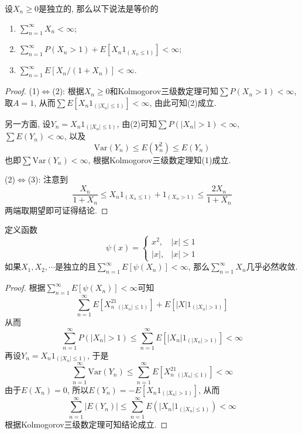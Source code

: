 \documentclass[cn, 12pt, math=mtpro2, bibstyle=apa, blue, twocol]{elegantbook}
\begin{document}
\begin{example}
设$X_n\ge0$是独立的, 那么以下说法是等价的
\begin{enumerate}[label=(\arabic*)]
  \item $\sum_{n=1}^{\infty}X_n<\infty$;
  \item $\sum_{n=1}^{\infty}P(X_n>1)+E[X_n1_{(X_n\leq 1)}]<\infty$;
  \item $\sum_{n=1}^{\infty}E[X_n/(1+X_n)]<\infty$.
\end{enumerate}
\end{example}
\begin{proof}
  (1)$\Longleftrightarrow$(2): 根据$X_n\ge0$和Kolmogorov三级数定理可知$\sum P(X_n>1)<\infty$, 取$A=1$, 从而$\sum E[X_n1_{(|X_n|\leq1)}]<\infty$, 由此可知(2)成立.

  另一方面, 设$Y_n=X_n1_{(|X_n|\leq 1)}$, 由(2)可知$\sum P(|X_n|>1)<\infty$, $\sum E(Y_n)<\infty$, 以及
  $$\text{Var}(Y_n)\leq E(Y^2_n)\leq E(Y_n)$$
  也即$\sum\text{Var}(Y_n)<\infty$, 根据Kolmogorov三级数定理知(1)成立.

  (2)$\Longleftrightarrow$(3): 注意到
  $$\frac{X_n}{1+X_n}\leq X_n1_{(X_n\leq1)}+1_{(X_n>1)} \leq \frac{2X_n}{1+X_n}$$
  两端取期望即可证得结论.
\end{proof}

\begin{example}
定义函数
$$\psi(x)=\begin{cases}
            x^2, & |x|\leq 1 \\
            |x|, & |x|>1
          \end{cases}
$$
如果$X_1,X_2,\cdots$是独立的且$\sum_{n=1}^{\infty}E[\psi(X_n)]<\infty$, 那么$\sum_{n=1}^{\infty}X_n$几乎必然收敛.
\end{example}
\begin{proof}
  根据$\sum_{n=1}^{\infty}E[\psi(X_n)]<\infty$可知
  $$\sum_{n=1}^{\infty} E[X_n^21_{(|X_n|\leq 1)}]+E[|X|1_{(|X_n|>1)}]$$
  从而
  $$\sum_{n=1}^{\infty}P(|X_n|>1)\leq \sum_{n=1}^{\infty}E[|X_n|1_{(|X_n|>1)}]<\infty$$
  再设$Y_n=X_n1_{(|X_n|\leq 1)}$, 于是
  $$\sum_{n=1}^{\infty}\text{Var}(Y_n)\leq \sum_{n=1}^{\infty}E[X_n^21_{(|X_n|\leq 1)}]<\infty$$
  由于$E(X_n)=0$, 所以$E(Y_n)=-E[X_n1_{(|X_n|>1)}]$, 从而
  $$\sum_{n=1}^{\infty}|E(Y_n)|\leq \sum_{n=1}^{\infty}E(|X_n|1_{(|X_n|\leq 1)})<\infty$$
  根据Kolmogorov三级数定理可知结论成立.
\end{proof}
\end{document}
